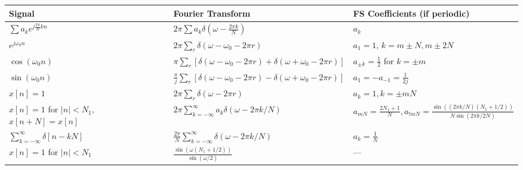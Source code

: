 \documentclass[8pt]{extarticle}
\begin{document}
\begin{table}[h]
    \centering
    \begin{tabular}{|l|l|l|}
        \hline
        \textbf{Signal}                               & \textbf{Fourier Transform}                                                                     & \textbf{FS Coefficients (if periodic)}                                                    \\ \hline
        $\sum a_k e^{j \frac{2\pi}{N} k n}$           & $2\pi \sum a_k \delta(\omega - \frac{2\pi k}{N})$                                              & $a_k$                                                                                     \\ \hline
        $e^{j\omega_0 n}$                             & $2\pi\sum_r \delta(\omega - \omega_0 - 2\pi r)$                                                & $a_1 = 1$, $k=m\pm N,m\pm 2N$                                                             \\ \hline
        $\cos(\omega_0 n)$                            & $\pi\sum_r[\delta(\omega - \omega_0 - 2\pi r) + \delta(\omega + \omega_0 - 2\pi r)]$           & $a_{\pm k} = \frac{1}{2}$ for $k=\pm m$                                                   \\ \hline
        $\sin(\omega_0 n)$                            & $\frac{\pi}{j}\sum_r[\delta(\omega - \omega_0 - 2\pi r) - \delta(\omega + \omega_0 - 2\pi r)]$ & $a_1 = -a_{-1} = \frac{1}{2j}$                                                            \\ \hline
        $x[n] = 1$                                    & $2\pi \sum_r \delta(\omega - 2\pi r)$                                                          & $a_k = 1, k=\pm mN$                                                                       \\ \hline
        $x[n]=1$ for $|n|<N_1$, $x[n+N]=x[n]$         & $2\pi \sum_{k=-\infty}^{\infty} a_k \delta(\omega - 2\pi k/N)$                                 & $a_{mN} = \frac{2N_1+1}{N}, a_{!mN} = \frac{\sin((2\pi k/N)(N_1+1/2))}{N\sin(2\pi k/2N)}$ \\ \hline
        $\sum_{k=-\infty}^{\infty}\delta[n-kN]$       & $\frac{2\pi}{N}\sum_{k=-\infty}^{\infty}\delta(\omega-2\pi k/N)$                               & $a_k = \frac{1}{N}$                                                                       \\ \hline
        $x[n] = 1$ for $|n|<N_1$                      & $\frac{\sin(\omega (N_1 +1/2))}{\sin(\omega/2)}$                                               & —                                                                                         \\ \hline

\end{tabular}
\end{table}
\end{document}
